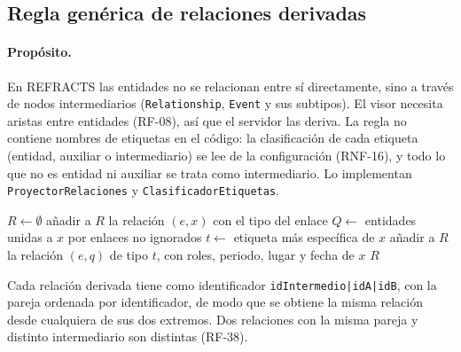 \subsection{Regla genérica de relaciones derivadas}
\label{sec:alg-derivadas}

\paragraph{Propósito.} En REFRACTS las entidades no se relacionan entre sí directamente, sino a través de nodos intermediarios (\texttt{Relationship}, \texttt{Event} y sus subtipos). El visor necesita aristas entre entidades (RF-08), así que el servidor las deriva. La regla no contiene nombres de etiquetas en el código: la clasificación de cada etiqueta (entidad, auxiliar o intermediario) se lee de la configuración (RNF-16), y todo lo que no es entidad ni auxiliar se trata como intermediario. Lo implementan \texttt{ProyectorRelaciones} y \texttt{ClasificadorEtiquetas}.

\begin{algorithm}[htbp]
  \caption{Relaciones derivadas de una entidad (\texttt{relaciones\_de}).}
  \label{alg:derivadas}
  \begin{algorithmic}[1]
      \State $R \gets \emptyset$
         
          \State añadir a $R$ la relación $(e, x)$ con el tipo del enlace
          \State $Q \gets$ entidades unidas a $x$ por enlaces no ignorados
           
            \State $t \gets$ etiqueta más específica de $x$
              \State añadir a $R$ la relación $(e, q)$ de tipo $t$, con roles, periodo, lugar y fecha de $x$
            \EndFor
          \EndIf
        \EndIf
      \EndFor
      \State \Return $R$
    \EndFunction
  \end{algorithmic}
\end{algorithm}

Cada relación derivada tiene como identificador \texttt{idIntermedio|idA|idB}, con la pareja ordenada por identificador, de modo que se obtiene la misma relación desde cualquiera de sus dos extremos. Dos relaciones con la misma pareja y distinto intermediario son distintas (RF-38).

